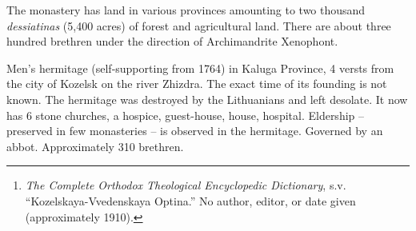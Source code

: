 The monastery has land in various provinces amounting to two thousand \textit{dessiatinas} (5,400 acres) of forest and agricultural land. There are about three hundred brethren under the direction of Archimandrite Xenophont.

\clearpage
\subtitle{
	Optina Hermitage\footnote{\textit{The Complete Orthodox Theological Encyclopedic Dictionary}, s.v. “Kozelskaya-Vvedenskaya Optina.” No author, editor, or date given (approximately 1910).}
}

Men's hermitage (self-supporting from 1764) in Kaluga Province, 4 versts from the city of Kozelsk on the river Zhizdra. The exact time of its founding is not known. The hermitage was destroyed by the Lithuanians and left desolate. It now has 6 stone churches, a hospice, guest-house, house, hospital. Eldership -- preserved in few monasteries -- is observed in the hermitage. Governed by an abbot. Approximately 310 brethren.